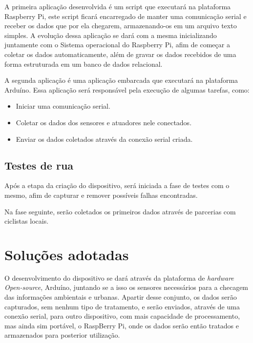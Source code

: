 \documentclass[final,12pt, times, 5p, twocolumn]{elsarticle}
\begin{document}
A primeira aplicação desenvolvida é um script que executará na plataforma Raspberry Pi, este script ficará encarregado de manter uma comunicação serial e receber os dados que por ela chegarem, armazenando-os em um arquivo texto simples. A evolução dessa aplicação se dará com a mesma inicializando juntamente com o Sistema operacional do Raspberry Pi, afim de começar a coletar os dados automaticamente, além de gravar os dados recebidos de uma forma estruturada em um banco de dados relacional.

A segunda aplicação é uma aplicação embarcada que executará na plataforma Arduíno. Essa aplicação será responsável pela execução de algumas tarefas, como:

\begin{itemize}

  \item Iniciar uma comunicação serial.
  \item Coletar os dados dos sensores e atuadores nele conectados.
  \item Enviar os dados coletados através da conexão serial criada.

\end{itemize}

\subsection{Testes de rua}

Após a etapa da criação do dispositivo, será iniciada a fase de testes com o mesmo, afim de capturar e remover possíveis falhas encontradas.

Na fase seguinte, serão coletados os primeiros dados através de parcerias com ciclistas locais.

\section{Soluções adotadas}

O desenvolvimento do dispositivo se dará através da plataforma  de \textit{hardware} \textit{Open-source}, Arduíno, juntando se a isso os sensores necessários para a checagem das informações ambientais e urbanas. Apartir desse conjunto, os dados serão capturados, sem nenhum tipo de tratamento, e serão enviados, através de uma conexão serial\cite{Conexao Serial}, para outro dispositivo, com mais capacidade de processamento, mas ainda sim portável, o RaspBerry Pi\cite{Raspberry Pi}, onde os dados serão então tratados e armazenados para posterior utilização.
\end{document}
